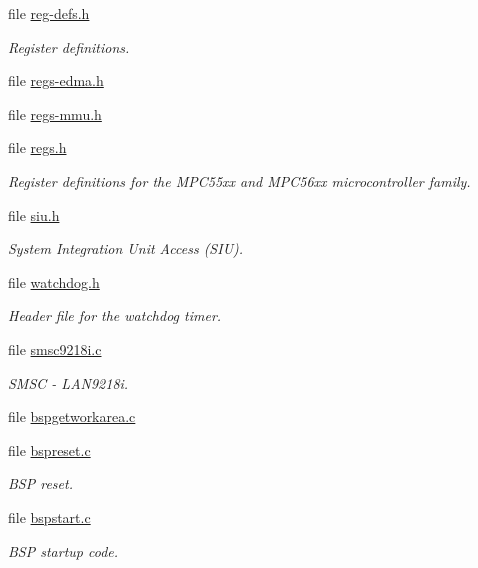 \begin{DoxyCompactItemize}
file \mbox{\hyperlink{reg-defs_8h}{reg-\/defs.\+h}}
\begin{DoxyCompactList}\small\item\em Register definitions. \end{DoxyCompactList}\item 
file \mbox{\hyperlink{regs-edma_8h}{regs-\/edma.\+h}}
\item 
file \mbox{\hyperlink{regs-mmu_8h}{regs-\/mmu.\+h}}
\item 
file \mbox{\hyperlink{powerpc_2mpc55xxevb_2include_2mpc55xx_2regs_8h}{regs.\+h}}
\begin{DoxyCompactList}\small\item\em Register definitions for the M\+P\+C55xx and M\+P\+C56xx microcontroller family. \end{DoxyCompactList}\item 
file \mbox{\hyperlink{siu_8h}{siu.\+h}}
\begin{DoxyCompactList}\small\item\em System Integration Unit Access (S\+IU). \end{DoxyCompactList}\item 
file \mbox{\hyperlink{bsps_2powerpc_2mpc55xxevb_2include_2mpc55xx_2watchdog_8h}{watchdog.\+h}}
\begin{DoxyCompactList}\small\item\em Header file for the watchdog timer. \end{DoxyCompactList}\item 
file \mbox{\hyperlink{smsc9218i_8c}{smsc9218i.\+c}}
\begin{DoxyCompactList}\small\item\em S\+M\+SC -\/ L\+A\+N9218i. \end{DoxyCompactList}\item 
file \mbox{\hyperlink{powerpc_2mpc55xxevb_2start_2bspgetworkarea_8c}{bspgetworkarea.\+c}}
\item 
file \mbox{\hyperlink{powerpc_2mpc55xxevb_2start_2bspreset_8c}{bspreset.\+c}}
\begin{DoxyCompactList}\small\item\em B\+SP reset. \end{DoxyCompactList}\item 
file \mbox{\hyperlink{powerpc_2mpc55xxevb_2start_2bspstart_8c}{bspstart.\+c}}
\begin{DoxyCompactList}\small\item\em B\+SP startup code. \end{DoxyCompactList}\item 

\end{DoxyCompactItemize}
